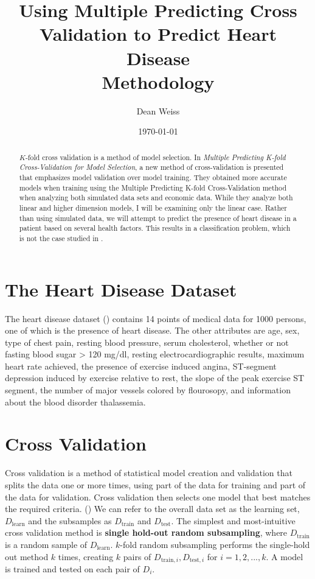 \documentclass[letter]{article}
\title{Using Multiple Predicting Cross Validation to Predict Heart Disease\\
\large Methodology}
\author{Dean Weiss}
\date{\today}
\begin{document}
\maketitle
\begin{abstract}
\(K\)-fold cross validation is a method of model selection.  In \textit{Multiple Predicting K-fold Cross-Validation for Model Selection}, 
a new method of cross-validation is presented that emphasizes model validation over model training.  They obtained more accurate models when 
training using the Multiple Predicting K-fold Cross-Validation method when analyzing both simulated data sets and economic data.  While they 
analyze both linear and higher dimension models, I will be examining only the linear case.  Rather than using simulated data, we will attempt
to predict the presence of heart disease in a patient based on several health factors.  This results in a classification problem, which
is not the case studied in \cite{yoonsuhmulpred}.
\end{abstract}
\section{The Heart Disease Dataset}
The heart disease dataset (\cite{heart_disease_dataset}) contains 14 points of medical data for 1000 persons, one of which is the presence of heart disease.  The other attributes are age, sex, type of chest pain, resting blood pressure, serum cholesterol, whether or not fasting blood sugar > 120 mg/dl,
resting electrocardiographic results, maximum heart rate achieved, the presence of exercise induced angina, ST-segment depression induced by exercise
relative to rest, the slope of the peak exercise ST segment, the number of major vessels colored by flourosopy, and information about the blood disorder thalassemia.
\section{Cross Validation}

Cross validation is a method of statistical model creation and validation that splits the data one or more times, using part of the data for training and part of the data for validation.  Cross validation then selects one model that best matches the required criteria. (\cite{Arlot_2010})  We can refer to the overall data set as the learning set, \(D_{\textrm{learn}}\) and the subsamples as \(D_{\textrm{train}}\) and \(D_{\textrm{test}}\).  The simplest and most-intuitive cross validation method is \textbf{single hold-out random subsampling}, where \(D_{\textrm{train}}\) is a random sample of \(D_{\textrm{learn}}\). \(k\)-fold random subsampling performs the single-hold out method \(k\) times, creating \(k\) pairs of \(D_{\textrm{train}, i}, D_{\textrm{test},i}\) for \(i=1,2,...,k\).  A model is trained and tested on each pair of \(D_i\).
\end{document}
